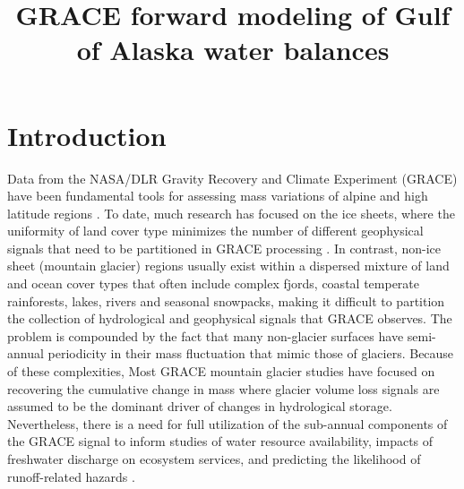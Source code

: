 \documentclass[review,oneside]{igs}
\begin{document}
\title[GRACE Forward Modeling]{GRACE forward modeling of Gulf of Alaska water balances}

\author[Arendt and others]{ }



\maketitle

\section{Introduction}

Data from the NASA/DLR Gravity Recovery and Climate Experiment (GRACE) have been fundamental tools for assessing mass variations of alpine and high latitude regions \citep{wouters_grace_2014}. To date, much research has focused on the ice sheets, where the uniformity of land cover type minimizes the number of different geophysical signals that need to be partitioned in GRACE processing \citep{shepherd_reconciled_2012}. In contrast, non-ice sheet (mountain glacier) regions usually exist within a dispersed mixture of land and ocean cover types that often include complex fjords, coastal temperate rainforests, lakes, rivers and seasonal snowpacks, making it difficult to partition the collection of hydrological and geophysical signals that GRACE observes. The problem is compounded by the fact that many non-glacier surfaces have semi-annual periodicity in their mass fluctuation that mimic those of glaciers. Because of these complexities, Most GRACE mountain glacier studies have focused on recovering the cumulative change in mass \citep{reager_decade_2016} where glacier volume loss signals are assumed to be the dominant driver of changes in hydrological storage. Nevertheless, there is a need for full utilization of the sub-annual components of the GRACE signal to inform studies of water resource availability, impacts of freshwater discharge on ecosystem services, and predicting the likelihood of runoff-related hazards \citep{oneel_icefield--ocean_2015}.
\end{document}
